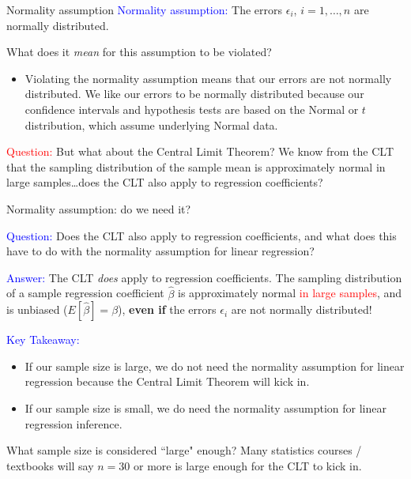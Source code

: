 \documentclass[10pt,t]{beamer}
\begin{document}
\begin{frame}{Normality assumption}
\textcolor{blue}{Normality assumption:} The errors $\epsilon_i$, $i = 1, \dots, n$ are normally distributed.

\vspace{0.3cm}

What does it \textit{mean} for this assumption to be violated?

\vspace{0.3cm}

\begin{itemize}
	\item[] Violating the normality assumption means that our errors are not normally distributed. We like our errors to be normally distributed because our confidence intervals and hypothesis tests are based on the Normal or $t$ distribution, which assume underlying Normal data. \pause
\end{itemize}

\vspace{0.3cm} 
\textcolor{red}{Question:} But what about the Central Limit Theorem? We know from the CLT that the sampling distribution of the sample mean is approximately normal in large samples\dots does the CLT also apply to regression coefficients?

\end{frame}

\begin{frame}{Normality assumption: do we need it?}
	\vspace{-5 mm}

\textcolor{blue}{Question:} Does the CLT also apply to regression coefficients, and what does this have to do with the normality assumption for linear regression?

\vspace{0.3cm} 

\textcolor{blue}{Answer:} The CLT \textit{does} apply to regression coefficients. The sampling distribution of a sample regression coefficient $\hat{\beta}$ is approximately normal \textcolor{red}{in large samples}, and is unbiased ($E[\hat{\beta}] = \beta$), \textbf{even if} the errors $\epsilon_i$ are not normally distributed! \pause

\vspace{0.3cm} 

\textcolor{blue}{Key Takeaway:} 
\begin{itemize}
	\item If our sample size is large, we do not need the normality assumption for linear regression because the Central Limit Theorem will kick in.
	\smallskip
	
	\item If our sample size is small, we do need the normality assumption for linear regression inference.
\end{itemize}

\small What sample size is considered ``large" enough? Many statistics courses / textbooks will say $n = 30$ or more is large enough for the CLT to kick in. 

\end{frame}
\end{document}

